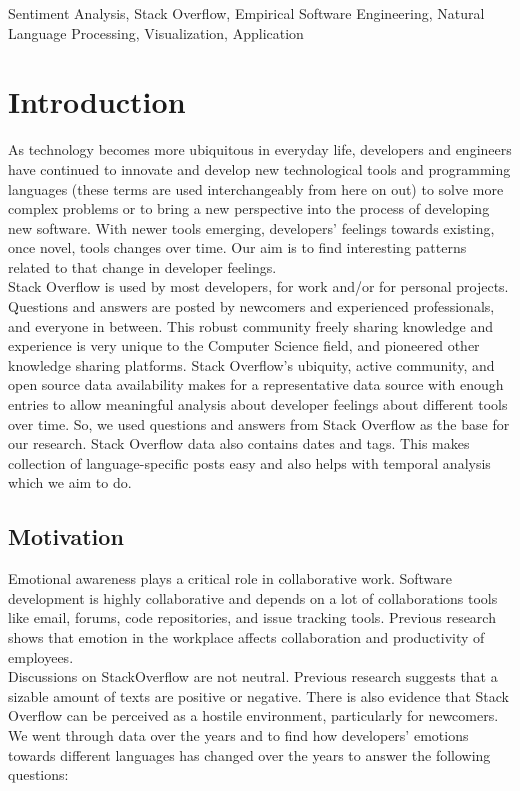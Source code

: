\documentclass[conference]{IEEEtran}
\begin{document}
\begin{IEEEkeywords}
Sentiment Analysis, Stack Overflow, Empirical Software Engineering, Natural Language Processing, Visualization, Application
\end{IEEEkeywords}

\section{Introduction}
As technology becomes more ubiquitous in everyday life, developers and engineers have continued to innovate and develop new technological tools and programming languages (these terms are used interchangeably from here on out) to solve more complex problems or to bring a new perspective into the process of developing new software. With newer tools emerging, developers' feelings towards existing, once novel, tools changes over time. Our aim is to find interesting patterns related to that change in developer feelings. \\

Stack Overflow is used by most developers, for work and/or for personal projects. Questions and answers are posted by newcomers and experienced professionals, and everyone in between. This robust community freely sharing knowledge and experience is very unique to the Computer Science field, and pioneered other knowledge sharing platforms. Stack Overflow's ubiquity, active community, and open source data availability makes for a representative data source with enough entries to allow meaningful analysis about developer feelings about different tools over time. So, we used questions and answers from Stack Overflow as the base for our research. Stack Overflow data also contains dates and tags. This makes collection of language-specific posts easy and also helps with temporal analysis which we aim to do.

\subsection{Motivation}
Emotional awareness plays a critical role in collaborative work. Software development is highly collaborative and depends on a lot of collaborations tools like email, forums, code repositories, and issue tracking tools\cite{b1}. Previous research shows that emotion in the workplace affects collaboration and productivity of employees\cite{b2}. \\

Discussions on StackOverflow are not neutral. Previous research suggests that a sizable amount of texts are positive or negative\cite{b3, b4, b5}. There is also evidence that Stack Overflow can be perceived as a hostile environment, particularly for newcomers\cite{b6}. We went through data over the years and to find how developers' emotions towards different languages has changed over the years to answer the following questions:\\
\end{document}
